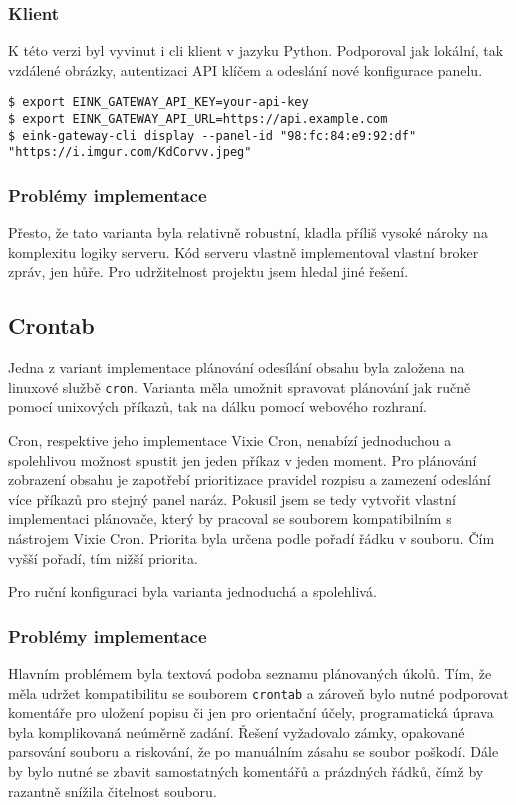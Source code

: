 \subsubsection{Klient}
K této verzi byl vyvinut i cli klient v jazyku Python. Podporoval jak lokální, tak vzdálené obrázky, autentizaci API klíčem a odeslání nové konfigurace panelu.

\begin{lstlisting}[label=src:eink-gateway-cli,caption={Ukázka programu eink-gateway-cli pro odeslání obrázku na panel}]
$ export EINK_GATEWAY_API_KEY=your-api-key
$ export EINK_GATEWAY_API_URL=https://api.example.com
$ eink-gateway-cli display --panel-id "98:fc:84:e9:92:df" "https://i.imgur.com/KdCorvv.jpeg"
\end{lstlisting}

\subsubsection{Problémy implementace}
Přesto, že tato varianta byla relativně robustní, kladla příliš vysoké nároky na komplexitu logiky serveru. Kód serveru vlastně implementoval vlastní broker zpráv, jen hůře. Pro udržitelnost projektu jsem hledal jiné řešení.

\subsection{Crontab}
Jedna z variant implementace plánování odesílání obsahu byla založena na linuxové službě \lstinline|cron|. Varianta měla umožnit spravovat plánování jak ručně pomocí unixových příkazů, tak na dálku pomocí webového rozhraní.

Cron, respektive jeho implementace Vixie Cron, nenabízí jednoduchou a spolehlivou možnost spustit jen jeden příkaz v jeden moment. Pro plánování zobrazení obsahu je zapotřebí prioritizace pravidel rozpisu a zamezení odeslání více příkazů pro stejný panel naráz. Pokusil jsem se tedy vytvořit vlastní implementaci plánovače, který by pracoval se souborem kompatibilním s nástrojem Vixie Cron. Priorita byla určena podle pořadí řádku v souboru. Čím vyšší pořadí, tím nižší priorita.

Pro ruční konfiguraci byla varianta jednoduchá a spolehlivá.

\subsubsection{Problémy implementace}
Hlavním problémem byla textová podoba seznamu plánovaných úkolů. Tím, že měla udržet kompatibilitu se souborem \lstinline|crontab| a zároveň bylo nutné podporovat komentáře pro uložení popisu či jen pro orientační účely, programatická úprava byla komplikovaná neúměrně zadání. Řešení vyžadovalo zámky, opakované parsování souboru a riskování, že po manuálním zásahu se soubor poškodí. Dále by bylo nutné se zbavit samostatných komentářů a prázdných řádků, čímž by razantně snížila čitelnost souboru.

